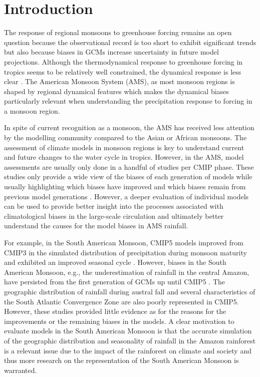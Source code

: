
\section{Introduction}

The response of regional monsoons to greenhouse forcing remains an open question \citep{zhou2016,pascale2019} because the observational record is too short to exhibit significant trends but also because biases in GCMs increase uncertainty in future model projections.
Although the thermodynamical response to greenhouse forcing in tropics seems to be relatively well constrained, the dynamical response is less clear \citep{shepherd2014}. The American Monsoon System (AMS), as most monsoon regions is shaped by regional dynamical features which makes the dynamical biases particularly relevant when understanding the precipitation response to forcing in a monsoon region. %

In spite of current recognition as a monsoon, the AMS has received less attention by the modelling community compared to the Asian or African monsoons. 
The assessment of climate models in monsoon regions is key to understand current and future changes to the water cycle in tropics. However, in the AMS, model assessments are usually only done in a handful of studies per CMIP phase.  These studies only provide a wide view of the biases of each generation of models while usually highlighting which biases have improved and which biases remain from previous model generations \citep[see e.g.][]{geil2013,ryu2014}. However, a deeper evaluation of individual models can be used to provide better insight into the processes associated with climatological biases in the large-scale circulation and ultimately better understand the causes for the model biases in AMS rainfall. 

For example, in the South American Monsoon, CMIP5 models improved from CMIP3 in the simulated distribution of precipitation during monsoon maturity and exhibited an improved seasonal cycle \citep{jones2013,yin2013}. However, biases in the South American Monsoon, e.g., the underestimation of rainfall in the central Amazon, have persisted from the first generation of GCMs up until CMIP5 \citep{li2006,yin2013}. The geographic distribution of rainfall during  austral fall and several characteristics of the South Atlantic Convergence Zone are also poorly represented in CMIP5. However, these studies provided little evidence as for the reasons for the improvements or the remaining biases in the models. 
A clear motivation to evaluate models in the South American Monsoon is that the accurate simulation of the geographic distribution and seasonality of rainfall in the Amazon rainforest is a relevant issue due to the impact of the rainforest on climate and society \citep[e.g.][]{li2006,Malhi20610,yin2013} and thus more research on the representation of the South American Monsoon is warranted.

